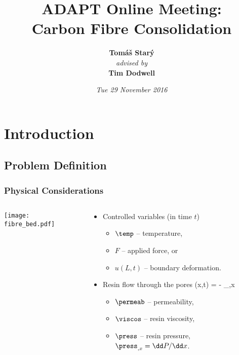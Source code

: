 \documentclass[compress]{beamer}%
\institute{\footnotesize 
  College of Engineering, Mathematics and Physical Sciences  \\[1ex]
}
\title{ADAPT Online Meeting:\\ Carbon Fibre Consolidation}
\author{ \textbf{\Large Tom\'a\v s Star\'y} \\ {\footnotesize\it advised by} \\[1ex] \textbf{\Large Tim Dodwell}
}
\date{
\it  Tue 29 November 2016
}
\newenvironment{myalign}
{\align\color{\notcolor}}
{
  \nonumber
  \endalign
  \vspace{-1em}
}
\begin{document}
 
\frame{\titlepage}

\section[Outline]{}
\frame{\tableofcontents}


\section{Introduction}

\subsection{Problem Definition}

\begin{frame}[label=A]
  \frametitle{Physical Considerations}
  \begin{columns}
    \begin{column}{0.4\textwidth}
      \texttt{[image: fibre\_bed.pdf]}
    \end{column}
    \begin{column}{0.6\textwidth}
      \begin{itemize}
      \item Controlled variables (in time $t$)
        \begin{itemize}
        \item $\temp$ -- temperature,
        \item $F$ -- applied force, or
        \item $u(L,t)$ -- boundary deformation.
        \end{itemize}
        
      \item Resin flow through the pores
        \begin{myalign}
          \flow(x,t) = - \press_{,x} 
        \end{myalign}
        \begin{itemize}
        \item $\permeab$ -- permeability,
        \item $\viscos$ -- resin viscosity,
        \item $\press$ -- resin pressure, $\press_{,x}= \dd P/\dd x$.
        \end{itemize}


\end{itemize}
\end{column}
\end{columns}
\end{frame}
\end{document}

